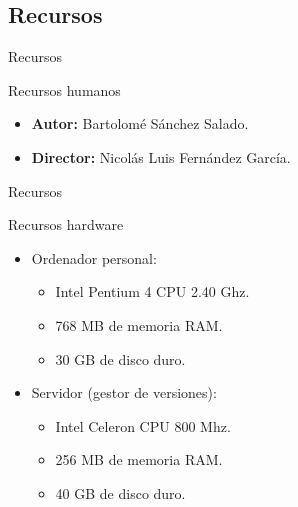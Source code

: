\documentclass[10pt, hyperref={pdfpagelabels=false}]{beamer}
\begin{document}
    \subsection{Recursos}
      \begin{frame}{Recursos}
        \begin{block}{Recursos humanos}
          \begin{itemize}
           \item \textbf{Autor:} Bartolomé Sánchez Salado.
           \item \textbf{Director:} Nicolás Luis Fernández García.
          \end{itemize}
        \end{block}
      \end{frame}

      \begin{frame}{Recursos}
        \begin{block}{Recursos hardware}
          \begin{itemize}
            \item Ordenador personal:
            \begin{itemize}
              \item Intel Pentium 4 CPU 2.40 Ghz.
              \item 768 MB de memoria RAM.
              \item 30 GB de disco duro.
            \end{itemize}
            \item Servidor (gestor de versiones):
            \begin{itemize}
              \item Intel Celeron CPU 800 Mhz.
              \item 256 MB de memoria RAM.
              \item 40 GB de disco duro.
            \end{itemize}
          \end{itemize}
        \end{block}
      \end{frame}
\end{document}
